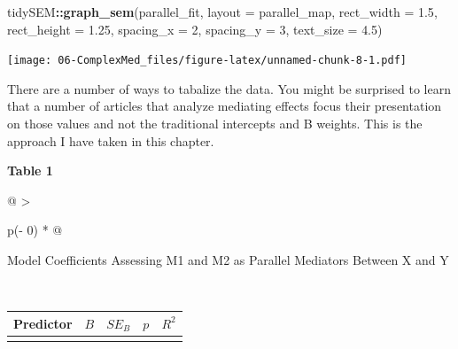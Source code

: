 \documentclass[
  11pt,
]{book}
\newenvironment{Shaded}{\begin{snugshade}}{\end{snugshade}}
\newcommand{\AttributeTok}[1]{\textcolor[rgb]{0.27,0.27,0.27}{#1}}
\newcommand{\DecValTok}[1]{\textcolor[rgb]{0.06,0.06,0.06}{#1}}
\newcommand{\FloatTok}[1]{\textcolor[rgb]{0.06,0.06,0.06}{#1}}
\newcommand{\FunctionTok}[1]{\textcolor[rgb]{0.27,0.27,0.27}{\textbf{#1}}}
\newcommand{\NormalTok}[1]{#1}
\newcommand{\SpecialCharTok}[1]{\textcolor[rgb]{0.43,0.43,0.43}{\textbf{#1}}}
\begin{document}
\begin{Shaded}
\begin{Highlighting}[]
\NormalTok{tidySEM}\SpecialCharTok{::}\FunctionTok{graph\_sem}\NormalTok{(parallel\_fit, }\AttributeTok{layout =}\NormalTok{ parallel\_map, }\AttributeTok{rect\_width =} \FloatTok{1.5}\NormalTok{,}
    \AttributeTok{rect\_height =} \FloatTok{1.25}\NormalTok{, }\AttributeTok{spacing\_x =} \DecValTok{2}\NormalTok{, }\AttributeTok{spacing\_y =} \DecValTok{3}\NormalTok{, }\AttributeTok{text\_size =} \FloatTok{4.5}\NormalTok{)}
\end{Highlighting}
\end{Shaded}

\texttt{[image: 06-ComplexMed\_files/figure-latex/unnamed-chunk-8-1.pdf]}

There are a number of ways to tabalize the data. You might be surprised to learn that a number of articles that analyze mediating effects focus their presentation on those values and not the traditional intercepts and B weights. This is the approach I have taken in this chapter.

\textbf{Table 1 }

\begin{longtable}[]{@{}
  >{\raggedright\arraybackslash}p{(\columnwidth - 0\tabcolsep) * }@{}}
\toprule\noalign{}
\begin{minipage}[b]{\linewidth}\raggedright
Model Coefficients Assessing M1 and M2 as Parallel Mediators Between X and Y
\end{minipage} \\
\midrule\noalign{}
\endhead
\bottomrule\noalign{}
\endlastfoot
\end{longtable}

\begin{longtable}[]{@{}lcccr@{}}
\toprule\noalign{}
Predictor & \(B\) & \(SE_{B}\) & \(p\) & \(R^2\) \\
\midrule\noalign{}
\endhead
\bottomrule\noalign{}
\endlastfoot
\end{longtable}
\end{document}
